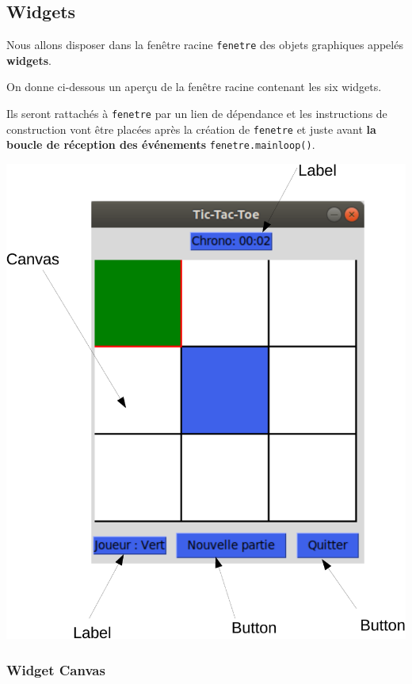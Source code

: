 \documentclass[a4paper, french, 12pt]{article}  %
\begin{document}
\subsection{Widgets}

Nous allons disposer dans la fenêtre racine  \lstinline+fenetre+ des objets graphiques appelés \textbf{widgets}. 

On donne ci-dessous un aperçu de la fenêtre racine contenant  les six widgets.

Ils seront rattachés à \lstinline+fenetre+ par un lien de dépendance et les instructions de construction vont être placées après la création de \lstinline+fenetre+ et juste avant \textbf{la boucle de réception des événements}  \lstinline+fenetre.mainloop()+.

\begin{center}
\includegraphics[scale=0.6]{graphiques/widgets-crop.pdf}
\end{center}

\subsubsection{Widget Canvas}
\end{document}
